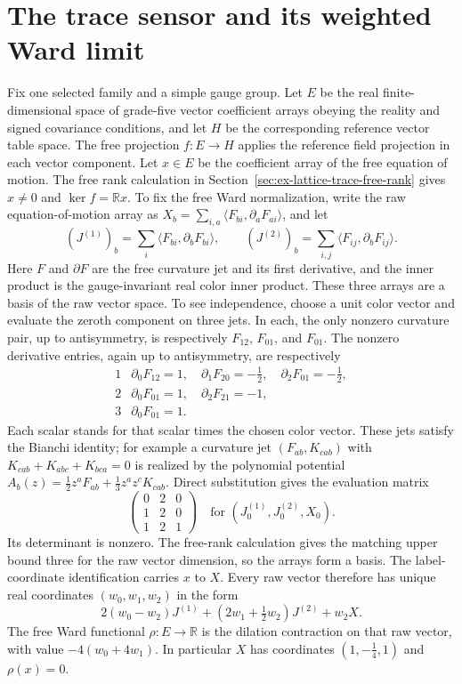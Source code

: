 \section{The trace sensor and its weighted Ward limit}
\label{sec:trace-prosper-sensor}

Fix one selected family and a simple gauge group. Let $E$ be the real
finite-dimensional space of grade-five vector coefficient arrays obeying the
reality and signed covariance conditions, and let $H$ be the corresponding
reference vector table space. The free projection $f:E\to H$ applies the
reference field projection in each vector component. Let $x\in E$ be the
coefficient array of the free equation of motion. The free rank calculation
in Section~\ref{sec:ex-lattice-trace-free-rank} gives $x\ne0$ and
$\ker f=\mathbb R x$. To fix the free Ward normalization, write the raw
equation-of-motion array as $X_b=\sum_{i,a}\langle F_{bi},\partial_a
F_{ai}\rangle$, and let
\[
 (J^{(1)})_b=\sum_i\langle F_{bi},\partial_b F_{bi}\rangle,\qquad
 (J^{(2)})_b=\sum_{i,j}\langle F_{ij},\partial_b F_{ij}\rangle.
\]
Here $F$ and $\partial F$ are the free curvature jet and its first derivative,
and the inner product is the gauge-invariant real color inner product. These
three arrays are a basis of the raw vector space. To see independence, choose
a unit color vector and evaluate the zeroth component on three jets. In each,
the only nonzero curvature pair, up to antisymmetry, is respectively $F_{12}$,
$F_{01}$, and $F_{01}$. The nonzero derivative entries, again up to
antisymmetry, are respectively
\[
 \begin{array}{c|l}
 1&\partial_0F_{12}=1,\quad \partial_1F_{20}=-\tfrac12,\quad
       \partial_2F_{01}=-\tfrac12,\\
 2&\partial_0F_{01}=1,\quad \partial_2F_{21}=-1,\\
 3&\partial_0F_{01}=1.
 \end{array}
\]
Each scalar stands for that scalar times the chosen color vector. These jets
satisfy the Bianchi identity; for example a curvature jet $(F_{ab},K_{cab})$
with $K_{cab}+K_{abc}+K_{bca}=0$ is realized by the polynomial potential
$A_b(z)=\tfrac12z^aF_{ab}+\tfrac13z^az^cK_{cab}$. Direct substitution gives
the evaluation matrix
\[
 \begin{pmatrix}0&2&0\\1&2&0\\1&2&1\end{pmatrix}
 \quad\text{for }(J^{(1)}_0,J^{(2)}_0,X_0).
\]
Its determinant is nonzero. The free-rank calculation gives the matching
upper bound three for the raw vector dimension, so the arrays form a basis.
The label-coordinate identification carries $x$ to $X$. Every raw vector
therefore has unique real coordinates $(w_0,w_1,w_2)$ in the form
\[
 2(w_0-w_2)J^{(1)}+(2w_1+\tfrac12w_2)J^{(2)}+w_2X.
\]
The free Ward functional $\rho:E\to\mathbb R$ is the dilation contraction
on that raw vector, with value $-4(w_0+4w_1)$. In particular $X$ has
coordinates $(1,-\tfrac14,1)$ and $\rho(x)=0$.

